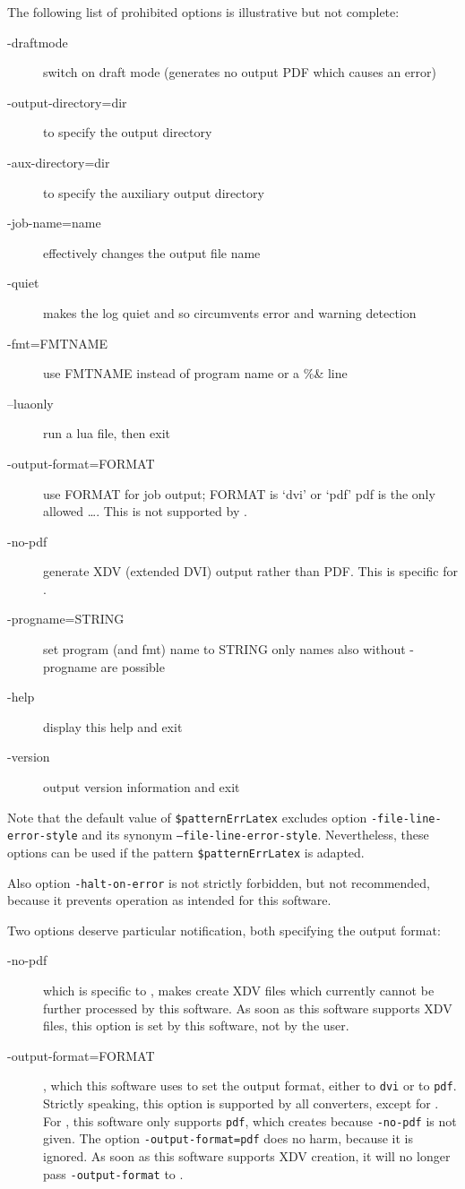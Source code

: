 The following list of prohibited options is illustrative but not complete: 
%
\begin{description}
  \item[-draftmode] switch on draft mode (generates no output PDF which causes an error) 
  \item[-output-directory=dir] to specify the output directory 
  \item[-aux-directory=dir] to specify the auxiliary output directory 
  \item[-job-name=name] effectively changes the output file name 
  \item[-quiet] makes the log quiet and 
      so circumvents error and warning detection 
  \item[-fmt=FMTNAME] use FMTNAME instead of program name or a \%\& line 
  \item[--luaonly] run a lua file, then exit 
  \item[-output-format=FORMAT] use FORMAT for job output; FORMAT is `dvi' or `pdf'
                   pdf is the only allowed \dots. 
                   This is not supported by \xelatex. 
  \item[-no-pdf] generate XDV (extended DVI) output rather than PDF\@. 
   This is specific for \xelatex. 
  \item[-progname=STRING] set program (and fmt) name to STRING
    only names also without -progname are possible 
  \item[-help] display this help and exit
  \item[-version] output version information and exit
\end{description}

Note that the default value of \texttt{\$patternErrLatex} 
excludes option \texttt{-file-line-error-style} 
and its synonym \texttt{--file-line-error-style}. 
Nevertheless, these options can be used 
if the pattern \texttt{\$patternErrLatex} is adapted. 

Also option \texttt{-halt-on-error} is not strictly forbidden, but not recommended, 
because it prevents operation as intended for this software. 


Two options deserve particular notification, both specifying the output format: 
%
\begin{description}
  \item[-no-pdf] which is specific to \xelatex, makes \xelatex{} create XDV files 
  which currently cannot be further processed by this software. 
  As soon as this software supports XDV files, this option is set by this software, 
  not by the user. 
  \item[-output-format=FORMAT], which this software uses to set the output format, 
  either to \texttt{dvi} or to \texttt{pdf}. 
  Strictly speaking, this option is supported by all converters, except for \xelatex. 
  For \xelatex, this software only supports \texttt{pdf}, 
  which \xelatex{} creates because \texttt{-no-pdf} is not given. 
  The option \texttt{-output-format=pdf} does no harm, because it is ignored. 
  As soon as this software supports XDV creation, 
  it will no longer pass \texttt{-output-format} to \xelatex. 
\end{description}


